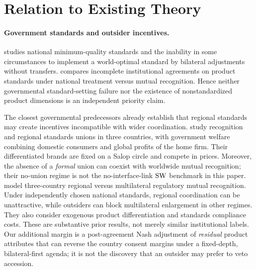 \section{Relation to Existing Theory}\label{sec:literature}

\paragraph{Government standards and outsider incentives.}
\citet{Petropoulou2013} studies national
minimum-quality standards and the inability
in some circumstances to implement a
world-optimal standard by bilateral
adjustments without transfers.
\citet{Costinot2008} compares incomplete
institutional agreements on product
standards under national treatment
versus mutual recognition. Hence neither
governmental standard-setting failure nor
the existence of nonstandardized product
dimensions is an independent priority claim.

The closest governmental predecessors already establish that
regional standards may create incentives incompatible with wider
coordination. \citet{GandalShy2001} study recognition and
regional standards unions in three countries, with government
welfare combining domestic consumers and global profits of the
home firm. Their differentiated brands are fixed on a Salop
circle and compete in prices. Moreover, the absence of a
\emph{formal} union can coexist with worldwide mutual
recognition; their no-union regime is not the no-interface-link
$\mathrm{SW}$ benchmark in this paper.
\citet{TakaradaKawabata2025} model three-country
regional versus multilateral regulatory mutual recognition.
Under independently chosen national standards, regional
coordination can be unattractive, while outsiders can block
multilateral enlargement in other regimes. They also
consider exogenous product differentiation and standards
compliance costs. These are substantive prior results, not
merely similar institutional labels. Our additional margin
is a post-agreement Nash adjustment of \emph{residual} product
attributes that can reverse the country consent margins
under a fixed-depth, bilateral-first agenda; it is not the
discovery that an outsider may prefer to veto accession.

